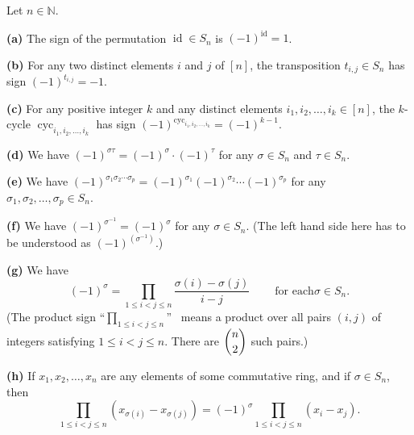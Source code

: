 \begin{proposition}
\label{prop.perm.sign.props}Let $n\in\mathbb{N}$. \medskip

\textbf{(a)} The sign of the permutation $\operatorname*{id}\in S_{n}$ is
$\left(  -1\right)  ^{\operatorname*{id}}=1$. \medskip

\textbf{(b)} For any two distinct elements $i$ and $j$ of $\left[  n\right]
$, the transposition $t_{i,j}\in S_{n}$ has sign $\left(  -1\right)
^{t_{i,j}}=-1$. \medskip

\textbf{(c)} For any positive integer $k$ and any distinct elements
$i_{1},i_{2},\ldots,i_{k}\in\left[  n\right]  $, the $k$-cycle
$\operatorname*{cyc}\nolimits_{i_{1},i_{2},\ldots,i_{k}}$ has sign $\left(
-1\right)  ^{\operatorname*{cyc}\nolimits_{i_{1},i_{2},\ldots,i_{k}}}=\left(
-1\right)  ^{k-1}$. \medskip

\textbf{(d)} We have $\left(  -1\right)  ^{\sigma\tau}=\left(  -1\right)
^{\sigma}\cdot\left(  -1\right)  ^{\tau}$ for any $\sigma\in S_{n}$ and
$\tau\in S_{n}$. \medskip

\textbf{(e)} We have $\left(  -1\right)  ^{\sigma_{1}\sigma_{2}\cdots
\sigma_{p}}=\left(  -1\right)  ^{\sigma_{1}}\left(  -1\right)  ^{\sigma_{2}%
}\cdots\left(  -1\right)  ^{\sigma_{p}}$ for any $\sigma_{1},\sigma_{2}%
,\ldots,\sigma_{p}\in S_{n}$. \medskip

\textbf{(f)} We have $\left(  -1\right)  ^{\sigma^{-1}}=\left(  -1\right)
^{\sigma}$ for any $\sigma\in S_{n}$. (The left hand side here has to be
understood as $\left(  -1\right)  ^{\left(  \sigma^{-1}\right)  }$.) \medskip

\textbf{(g)} We have%
\[
\left(  -1\right)  ^{\sigma}=\prod_{1\leq i<j\leq n}\dfrac{\sigma\left(
i\right)  -\sigma\left(  j\right)  }{i-j}\ \ \ \ \ \ \ \ \ \ \text{for each
}\sigma\in S_{n}.
\]
(The product sign \textquotedblleft$\prod_{1\leq i<j\leq n}$\textquotedblright%
\ means a product over all pairs $\left(  i,j\right)  $ of integers satisfying
$1\leq i<j\leq n$. There are $\dbinom{n}{2}$ such pairs.) \medskip

\textbf{(h)} If $x_{1},x_{2},\ldots,x_{n}$ are any elements of some
commutative ring, and if $\sigma\in S_{n}$, then%
\[
\prod_{1\leq i<j\leq n}\left(  x_{\sigma\left(  i\right)  }-x_{\sigma\left(
j\right)  }\right)  =\left(  -1\right)  ^{\sigma}\prod_{1\leq i<j\leq
n}\left(  x_{i}-x_{j}\right)  .
\]

\end{proposition}

